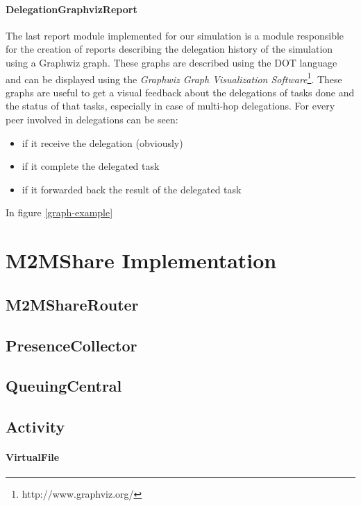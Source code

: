 \paragraph{DelegationGraphvizReport}
The last report module implemented for our simulation is a module responsible for the creation of reports describing the delegation history of the simulation using a Graphwiz graph. These graphs are described using the DOT language and can be displayed using the \textit{Graphwiz Graph Visualization Software}\footnote{http://www.graphviz.org/}. These graphs are useful to get a visual feedback about the delegations of tasks done and the status of that tasks, especially in case of multi-hop delegations. For every peer involved in delegations can be seen:
\begin{itemize}
\item if it receive the delegation (obviously)
\item if it complete the delegated task
\item if it forwarded back the result of the delegated task
\end{itemize}
In figure \ref{graph-example}


\section{M2MShare Implementation}

\subsection{M2MShareRouter}

\subsection{PresenceCollector}

\subsection{QueuingCentral}

\subsection{Activity}
\paragraph{VirtualFile}
